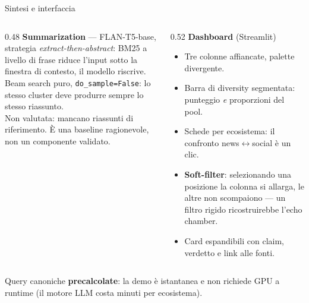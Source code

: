 \documentclass[aspectratio=169,11pt]{beamer}
\begin{document}
\begin{frame}{Sintesi e interfaccia}
  \begin{columns}[T]
    \begin{column}{0.48\textwidth}
      \footnotesize
      \textbf{Summarization} --- FLAN-T5-base, strategia
      \emph{extract-then-abstract}: BM25 a livello di frase riduce l'input sotto la finestra
      di contesto, il modello riscrive.\\[0.3em]
      Beam search puro, \texttt{do\_sample=False}: lo stesso cluster deve produrre sempre lo
      stesso riassunto.\\[0.3em]
      {\color{echoslate}Non valutata: mancano riassunti di riferimento. È una baseline
      ragionevole, non un componente validato.}
    \end{column}
    \begin{column}{0.52\textwidth}
      \footnotesize
      \textbf{Dashboard} (Streamlit)
      \begin{itemize}\footnotesize
        \item Tre colonne affiancate, palette divergente.
        \item Barra di diversity segmentata: punteggio \emph{e} proporzioni del pool.
        \item Schede per ecosistema: il confronto news$\leftrightarrow$social è un clic.
        \item \textbf{Soft-filter}: selezionando una posizione la colonna si allarga,
              le altre \alert{non scompaiono} --- un filtro rigido ricostruirebbe
              l'echo chamber.
        \item Card espandibili con claim, verdetto e link alle fonti.
      \end{itemize}
    \end{column}
  \end{columns}
  \vspace{0.3em}
  {\footnotesize\color{echoslate} Query canoniche \textbf{precalcolate}: la demo è istantanea
  e non richiede GPU a runtime (il motore LLM costa minuti per ecosistema).}
\end{frame}
\end{document}
